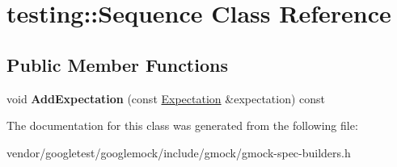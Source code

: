 \hypertarget{classtesting_1_1Sequence}{}\section{testing\+:\+:Sequence Class Reference}
\label{classtesting_1_1Sequence}
\subsection*{Public Member Functions}
\begin{DoxyCompactItemize}
\item 
void {\bfseries Add\+Expectation} (const \hyperlink{classtesting_1_1Expectation}{Expectation} \&expectation) const \hypertarget{classtesting_1_1Sequence_adb14a0e1b0339a035cf3da28e394a5b7}{}\label{classtesting_1_1Sequence_adb14a0e1b0339a035cf3da28e394a5b7}

\end{DoxyCompactItemize}


The documentation for this class was generated from the following file\+:\begin{DoxyCompactItemize}
\item 
vendor/googletest/googlemock/include/gmock/gmock-\/spec-\/builders.\+h\end{DoxyCompactItemize}
